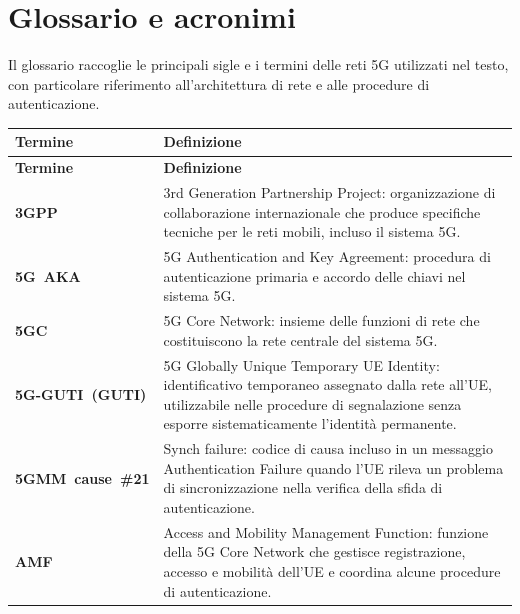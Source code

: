 \chapter*{Glossario e acronimi}
{}

Il glossario raccoglie le principali sigle e i termini delle reti 5G utilizzati nel testo, con particolare riferimento all'architettura di rete e alle procedure di autenticazione.

\begingroup
\setlength{\tabcolsep}{6pt}
\renewcommand{\arraystretch}{1.28}
\setlength{\extrarowheight}{2pt}
\setlength{\LTpre}{0.7\baselineskip}
\setlength{\LTpost}{0pt}
\begin{longtable}{|>{\raggedright\arraybackslash}p{}|>{\raggedright\arraybackslash}p{}|}
\hline
\textbf{Termine} & \textbf{Definizione} \\
\hline
\endfirsthead
\hline
\textbf{Termine} & \textbf{Definizione} \\
\hline
\endhead
\endfoot
\endlastfoot

\mbox{\textbf{3GPP}} & 3rd Generation Partnership Project: organizzazione di collaborazione internazionale che produce specifiche tecniche per le reti mobili, incluso il sistema 5G. \\
\hline

\mbox{\textbf{5G AKA}} & 5G Authentication and Key Agreement: procedura di autenticazione primaria e accordo delle chiavi nel sistema 5G. \\
\hline

\mbox{\textbf{5GC}} & 5G Core Network: insieme delle funzioni di rete che costituiscono la rete centrale del sistema 5G. \\
\hline

\mbox{\textbf{5G-GUTI (GUTI)}} & 5G Globally Unique Temporary UE Identity: identificativo temporaneo assegnato dalla rete all'UE, utilizzabile nelle procedure di segnalazione senza esporre sistematicamente l'identità permanente. \\
\hline

\mbox{\textbf{5GMM cause \#21}} & Synch failure: codice di causa incluso in un messaggio Authentication Failure quando l'UE rileva un problema di sincronizzazione nella verifica della sfida di autenticazione. \\
\hline

\mbox{\textbf{AMF}} & Access and Mobility Management Function: funzione della 5G Core Network che gestisce registrazione, accesso e mobilità dell'UE e coordina alcune procedure di autenticazione. \\
\hline


\end{longtable}
